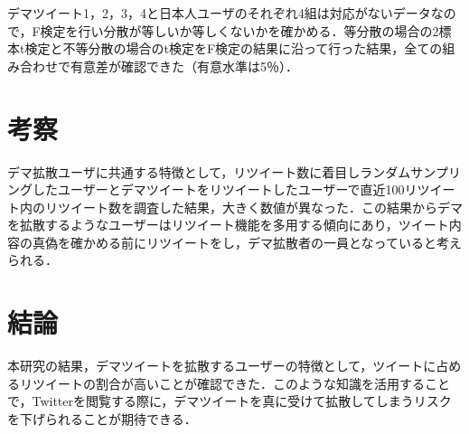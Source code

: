 \documentclass[uplatex,twocolumn,dvipdfmx]{jsarticle}
\begin{document}
デマツイート1，2，3，4と日本人ユーザのそれぞれ4組は対応がないデータなので，F検定を行い分散が等しいか等しくないかを確かめる．等分散の場合の2標本t検定と不等分散の場合のt検定をF検定の結果に沿って行った結果，全ての組み合わせで有意差が確認できた（有意水準は5％）．

\section{考察}
デマ拡散ユーザに共通する特徴として，リツイート数に着目しランダムサンプリングしたユーザーとデマツイートをリツイートしたユーザーで直近100リツイート内のリツイート数を調査した結果，大きく数値が異なった．この結果からデマを拡散するようなユーザーはリツイート機能を多用する傾向にあり，ツイート内容の真偽を確かめる前にリツイートをし，デマ拡散者の一員となっていると考えられる．

\section{結論}
本研究の結果，デマツイートを拡散するユーザーの特徴として，ツイートに占めるリツイートの割合が高いことが確認できた．このような知識を活用することで，Twitterを閲覧する際に，デマツイートを真に受けて拡散してしまうリスクを下げられることが期待できる．


\end{document}
